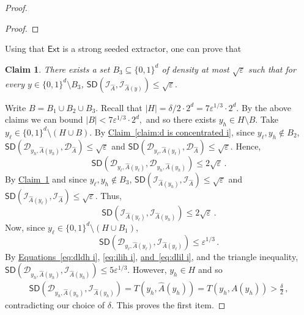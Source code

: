 \documentclass[11pt]{article}
\numberwithin{equation}{section}
\newtheorem{claim}[theorem]{Claim}
\theoremstyle{definition}
\theoremstyle{plain}
\newcommand{\expref}[2]{\hyperref[#2]{#1~\ref{#2}}}
\newcommand{\expeqref}[2]{\hyperref[#2]{#1~\eqref{#2}}}
\newcommand{\ext}{\mathsf{Ext}}
\newcommand{\adv}{A}
\newcommand{\eps}{\varepsilon}
\newcommand{\abs}[1]{\left\lvert #1\right\rvert}
\def\SD{\ensuremath{\mathsf{SD}}}
\begin{document}
\begin{proof}
\begin{proof}
	\end{proof}
	Using that $\ext$ is a strong seeded extractor, one can prove that
	\begin{claim}\label{claim:i is concentrated i}
		There exists a set
		$B_3 \subseteq \{0,1\}^d$ of density at most $\sqrt{\eps}$ such that for every $y \in \{0,1\}^d \setminus B_3$,
		$
		\SD(\mathcal{I}_{\widehat{A}}, \mathcal{I}_{\widehat{A}(y)}) \le \sqrt{\eps}.
		$
	\end{claim}
	
	Write $B = B_1 \cup B_2 \cup B_3$. Recall that 
	$\abs{H} = \delta/2\cdot 2^d = 7\eps^{1/3} \cdot 2^d.$ 
	By the above claims we can bound
	$
	\abs{B} < 7\eps^{1/3} \cdot 2^d,
	$
	and so there exists $y_h \in H \setminus B$.  Take $y_\ell \in \{0,1\}^d \setminus (H \cup B)$. 	
	By \expref{Claim}{claim:d is concentrated i}, since $y_\ell,y_h \notin B_2$,
	$\SD(\mathcal{D}_{y_h,\widehat{A}(y_h)}, \mathcal{D}_{\widehat{A}} ) \le \sqrt{\eps}$ and
	$\SD(\mathcal{D}_{y_\ell,\widehat{A}(y_\ell)}, \mathcal{D}_{\widehat{A}} ) \le \sqrt{\eps}.
	$
	Hence,
	\begin{equation}\label{eq:dldh i}
	\SD\left(\mathcal{D}_{y_\ell,\widehat{A}(y_\ell)}, \mathcal{D}_{y_h,\widehat{A}(y_h)}\right) \le 2\sqrt{\eps}\,.
	\end{equation}
	By \expref{Claim}{claim:i is concentrated i} and since $y_\ell,y_h \notin B_3$,
 	$
	\SD(\mathcal{I}_{\widehat{A}(y_h)}, \mathcal{I}_{\widehat{A}} ) \le \sqrt{\eps}$ and
	$\SD(\mathcal{I}_{\widehat{A}(y_\ell)}, \mathcal{I}_{\widehat{A}} ) \le \sqrt{\eps}.
$
	Thus,
	\begin{equation}\label{eq:ilih i}
	\SD\left(\mathcal{I}_{\widehat{A}(y_\ell)}, \mathcal{I}_{\widehat{A}(y_h)} \right) \le 2\sqrt{\eps}\,.
	\end{equation}
	Now, since $y_\ell \in \{0,1\}^d \setminus (H \cup B_1)$,
	\begin{equation}\label{eq:dlil i}
	\SD\left(\mathcal{D}_{y_\ell,\widehat{A}(y_\ell)}, \mathcal{I}_{\widehat{A}(y_\ell)}\right) \le \eps^{1/3}\,.
	\end{equation}
%
 By \expeqref{Equations}{eq:dldh i}, \eqref{eq:ilih i}, \expeqref{and}{eq:dlil i}, %
and the triangle inequality,
	$
	\SD(\mathcal{D}_{y_h,\widehat{A}(y_h)}, \mathcal{I}_{\widehat{A}(y_h)}) \le 5 \eps^{1/3}.
	$
	However, $y_h \in H$ and so
	\begin{align*}
	\SD\left( \mathcal{D}_{y_h,\widehat{A}(y_h)}, \mathcal{I}_{\widehat{A}(y_h)} \right) = T\left(y_h,\widehat{A}(y_h)\right) 
	= T(y_h, \adv(y_h)) > \frac{\delta}{2}\,,
	\end{align*}
	contradicting our choice of $\delta$. This proves the first item.
	

\end{proof}
\end{document}
